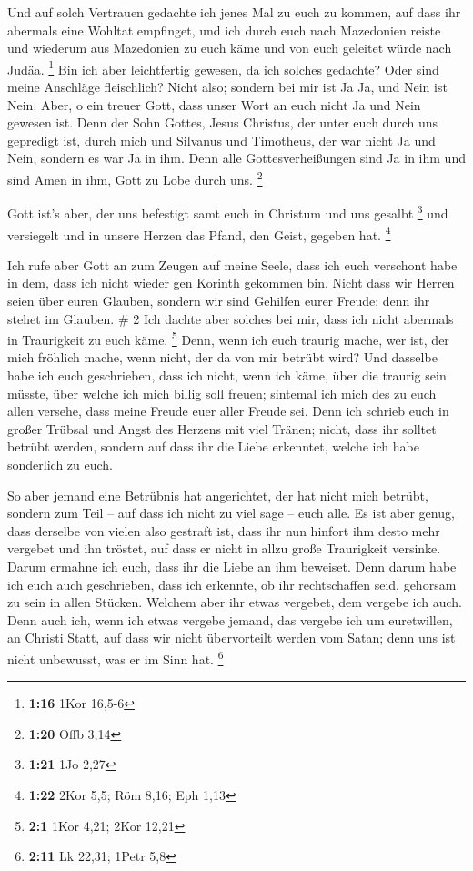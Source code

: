  Und auf solch Vertrauen gedachte ich jenes Mal zu euch zu
kommen, auf dass ihr abermals eine Wohltat empfinget,  und
ich durch euch nach Mazedonien reiste und wiederum aus Mazedonien zu
euch käme und von euch geleitet würde nach Judäa. \footnote{\textbf{1:16}
  1Kor 16,5-6}  Bin ich aber leichtfertig gewesen, da ich
solches gedachte? Oder sind meine Anschläge fleischlich? Nicht also;
sondern bei mir ist Ja Ja, und Nein ist Nein.  Aber, o ein
treuer Gott, dass unser Wort an euch nicht Ja und Nein gewesen ist.
 Denn der Sohn Gottes, Jesus Christus, der unter euch durch
uns gepredigt ist, durch mich und Silvanus und Timotheus, der war nicht
Ja und Nein, sondern es war Ja in ihm.  Denn alle
Gottesverheißungen sind Ja in ihm und sind Amen in ihm, Gott zu Lobe
durch uns. \footnote{\textbf{1:20} Offb 3,14}

 Gott ist's aber, der uns befestigt samt euch in Christum
und uns gesalbt \footnote{\textbf{1:21} 1Jo 2,27}  und
versiegelt und in unsere Herzen das Pfand, den Geist, gegeben hat.
\footnote{\textbf{1:22} 2Kor 5,5; Röm 8,16; Eph 1,13}

 Ich rufe aber Gott an zum Zeugen auf meine Seele, dass ich
euch verschont habe in dem, dass ich nicht wieder gen Korinth gekommen
bin.  Nicht dass wir Herren seien über euren Glauben,
sondern wir sind Gehilfen eurer Freude; denn ihr stehet im Glauben. \# 2
 Ich dachte aber solches bei mir, dass ich nicht abermals in
Traurigkeit zu euch käme. \footnote{\textbf{2:1} 1Kor 4,21; 2Kor 12,21}
 Denn, wenn ich euch traurig mache, wer ist, der mich
fröhlich mache, wenn nicht, der da von mir betrübt wird? 
Und dasselbe habe ich euch geschrieben, dass ich nicht, wenn ich käme,
über die traurig sein müsste, über welche ich mich billig soll freuen;
sintemal ich mich des zu euch allen versehe, dass meine Freude euer
aller Freude sei.  Denn ich schrieb euch in großer Trübsal
und Angst des Herzens mit viel Tränen; nicht, dass ihr solltet betrübt
werden, sondern auf dass ihr die Liebe erkenntet, welche ich habe
sonderlich zu euch.

 So aber jemand eine Betrübnis hat angerichtet, der hat
nicht mich betrübt, sondern zum Teil -- auf dass ich nicht zu viel sage
-- euch alle.  Es ist aber genug, dass derselbe von vielen
also gestraft ist,  dass ihr nun hinfort ihm desto mehr
vergebet und ihn tröstet, auf dass er nicht in allzu große Traurigkeit
versinke.  Darum ermahne ich euch, dass ihr die Liebe an ihm
beweiset.  Denn darum habe ich euch auch geschrieben, dass
ich erkennte, ob ihr rechtschaffen seid, gehorsam zu sein in allen
Stücken.  Welchem aber ihr etwas vergebet, dem vergebe ich
auch. Denn auch ich, wenn ich etwas vergebe jemand, das vergebe ich um
euretwillen, an Christi Statt,  auf dass wir nicht
übervorteilt werden vom Satan; denn uns ist nicht unbewusst, was er im
Sinn hat. \footnote{\textbf{2:11} Lk 22,31; 1Petr 5,8}

